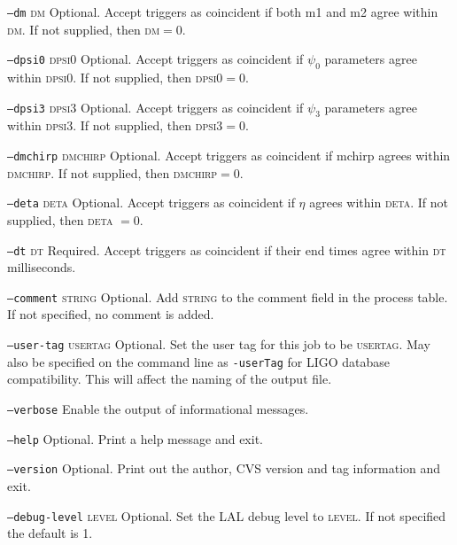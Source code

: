 \begin{entry}
\begin{entry}
\item[\texttt{--dm} \textsc{dm}] Optional. Accept triggers as coincident if
both m1 and m2 agree within \textsc{dm}.  If not supplied, then \textsc{dm}$=
0$.

\item[\texttt{--dpsi0} \textsc{dpsi0}] Optional. Accept
triggers as coincident if $\psi_{0}$ parameters agree within
\textsc{dpsi0}.  If not supplied,  then \textsc{dpsi0}$= 0$.

\item[\texttt{--dpsi3} \textsc{dpsi3}] Optional. Accept
triggers as coincident if $\psi_{3}$ parameters agree within
\textsc{dpsi3}.  If not supplied,  then \textsc{dpsi3}$= 0$.

\item[\texttt{--dmchirp} \textsc{dmchirp}] Optional. Accept
triggers as coincident if mchirp agrees within \textsc{dmchirp}.  If not
supplied, then \textsc{dmchirp}$ = 0$.

\item[\texttt{--deta} \textsc{deta}] Optional. Accept triggers
as coincident if $\eta$ agrees within \textsc{deta}.  If not supplied,
then \textsc{deta} $= 0$.

\item[\texttt{--dt} \textsc{dt}] Required. Accept triggers as
coincident if their end times agree within \textsc{dt} milliseconds.  


\item[\texttt{--comment} \textsc{string}] Optional. Add \textsc{string}
to the comment field in the process table. If not specified, no comment
is added. 

\item[\texttt{--user-tag} \textsc{usertag}] Optional. Set the user tag for
this job to be \textsc{usertag}. May also be specified on the command line as
\texttt{-userTag} for LIGO database compatibility.  This will affect the
naming of the output file.

\item[\texttt{--verbose}] Enable the output of informational messages.

\item[\texttt{--help}] Optional.  Print a help message and exit.

\item[\texttt{--version}] Optional.  Print out the author, CVS version and
tag information and exit.

\item[\texttt{--debug-level} \textsc{level}] Optional. Set the LAL debug
level to \textsc{level}. If not specified the default is 1.


\end{entry}
\end{entry}
